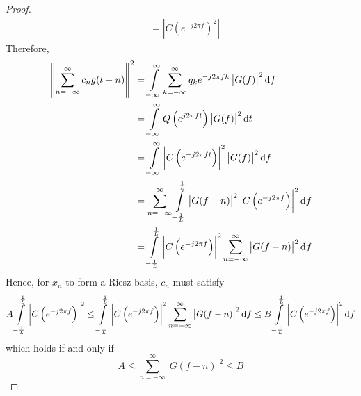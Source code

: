 \documentclass[titlepage, fleqn, a4paper, 12pt, twoside]{article}
\theoremstyle{definition}
\theoremstyle{theorem}
\begin{document}
\begin{proof}
\begin{align*}
		&= \left| C\left( e^{-j 2 \pi f} \right)^2 \right|
	\end{align*}
	Therefore,
	\begin{align*}
		\left\| \sum\limits_{n = -\infty}^{\infty} c_n g(t - n) \right\|^2 &= \int\limits_{-\infty}^{\infty} \sum\limits_{k = -\infty}^{\infty} q_k e^{-j 2 \pi f k} \left| G(f) \right|^2 \dif f\\
		&= \int\limits_{-\infty}^{\infty} Q\left( e^{j 2 \pi f t} \right) \left| G(f) \right|^2 \dif t\\
		&= \int\limits_{-\infty}^{\infty} \left| C\left( e^{-j 2 \pi f t} \right) \right|^2 \left| G(f) \right|^2 \dif f\\
		&= \sum\limits_{n = -\infty}^{\infty} \int\limits_{-\frac{1}{L}}^{\frac{1}{L}} \left| G(f - n) \right|^2 \left| C\left( e^{-j 2 \pi f} \right) \right|^2 \dif f\\
		&= \int\limits_{-\frac{1}{L}}^{\frac{1}{L}} \left| C\left( e^{-j 2 \pi f} \right) \right|^2 \sum\limits_{n = -\infty}^{\infty} \left| G(f - n) \right|^2 \dif f
	\end{align*}
	Hence, for $x_n$ to form a Riesz basis, $c_n$ must satisfy
	\begin{equation*}
		A \int\limits_{-\frac{1}{L}}^{\frac{1}{L}} \left| C\left( e^{-j 2 \pi f} \right) \right|^2 \le \int\limits_{-\frac{1}{L}}^{\frac{1}{L}} \left| C\left( e^{-j 2 \pi f} \right) \right|^2 \sum\limits_{n = -\infty}^{\infty} \left| G(f - n) \right|^2 \dif f \le B \int\limits_{-\frac{1}{L}}^{\frac{1}{L}} \left| C\left( e^{-j 2 \pi f} \right) \right|^2 \dif f
	\end{equation*}
	which holds if and only if
	\begin{equation*}
		A \le \sum\limits_{n = -\infty}^{\infty} \left| G(f - n) \right|^2 \le B
	\end{equation*}
\end{proof}
\end{document}
